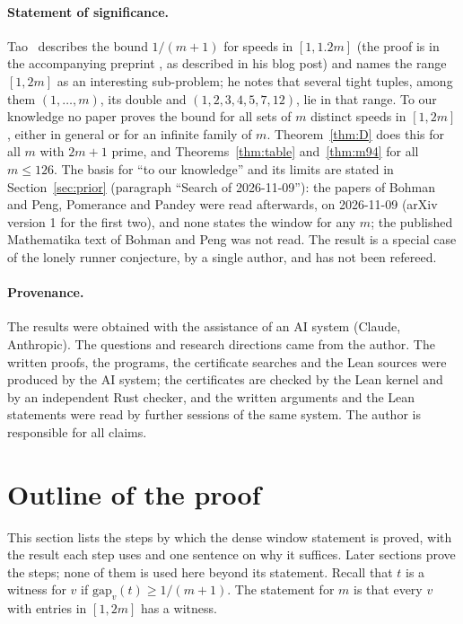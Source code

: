 \documentclass[11pt]{article}
\theoremstyle{remark}
\newcommand{\gap}{\mathrm{gap}}
\begin{document}
\paragraph{Statement of significance.} Tao~\cite{TaoBlog} describes the bound $1/(m+1)$ for speeds in $[1,1.2m]$ (the proof is in the accompanying preprint \cite{Tao17}, as described in his blog post) and names the range $[1,2m]$ as an interesting sub-problem; he notes that several tight tuples, among them $(1,\dots,m)$, its double and $(1,2,3,4,5,7,12)$, lie in that range. To our knowledge no paper proves the bound for all sets of $m$ distinct speeds in $[1,2m]$, either in general or for an infinite family of $m$. Theorem~\ref{thm:D} does this for all $m$ with $2m+1$ prime, and Theorems~\ref{thm:table} and~\ref{thm:m94} for all $m\le126$. The basis for ``to our knowledge'' and its limits are stated in Section~\ref{sec:prior} (paragraph ``Search of 2026-11-09''): the papers of Bohman and Peng, Pomerance and Pandey were read afterwards, on 2026-11-09 (arXiv version 1 for the first two), and none states the window for any $m$; the published Mathematika text of Bohman and Peng was not read. The result is a special case of the lonely runner conjecture, by a single author, and has not been refereed.

\paragraph{Provenance.} The results were obtained with the assistance of an AI system (Claude, Anthropic). The questions and research directions came from the author. The written proofs, the programs, the certificate searches and the Lean sources were produced by the AI system; the certificates are checked by the Lean kernel and by an independent Rust checker, and the written arguments and the Lean statements were read by further sessions of the same system. The author is responsible for all claims.

\section{Outline of the proof}\label{sec:outline}

This section lists the steps by which the dense window statement is proved, with the result each step uses and one sentence on why it suffices. Later sections prove the steps; none of them is used here beyond its statement. Recall that $t$ is a witness for $v$ if $\gap_v(t)\ge1/(m+1)$. The statement for $m$ is that every $v$ with entries in $[1,2m]$ has a witness.
\end{document}
